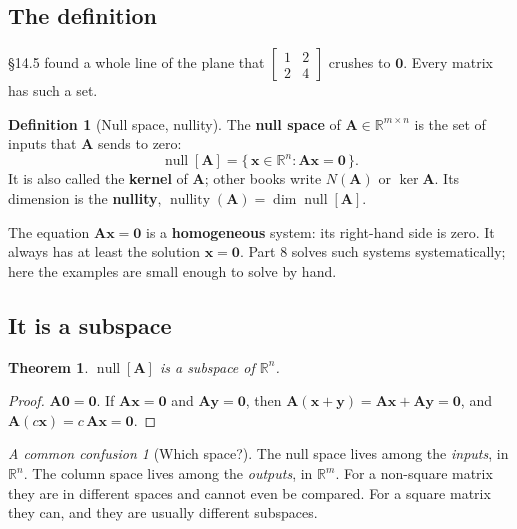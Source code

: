 \documentclass[11pt]{article}
\theoremstyle{plain}
\newtheorem{thm}{Theorem}[section]
\theoremstyle{definition}
\newtheorem{defn}{Definition}[section]
\theoremstyle{remark}
\newtheorem*{warn}{A common confusion}
\newcommand{\R}{\mathbb{R}}
\newcommand{\vc}[1]{\mathbf{#1}}
\newcommand{\mt}[1]{\mathbf{#1}}
\newcommand{\nullsp}[1]{\operatorname{null}[#1]}
\DeclareMathOperator{\nullity}{nullity}
\begin{document}
\subsection{The definition}
\S14.5 found a whole line of the plane that
$\begin{bmatrix}1&2\\2&4\end{bmatrix}$ crushes to $\vc{0}$. Every matrix has
such a set.

\begin{defn}[Null space, nullity]
The \textbf{null space} of $\mt{A}\in\R^{m\times n}$ is the set of inputs that
$\mt{A}$ sends to zero:
\[
  \nullsp{\mt{A}}=\{\,\vc{x}\in\R^{n}:\mt{A}\vc{x}=\vc{0}\,\}.
\]
It is also called the \textbf{kernel} of $\mt{A}$; other books write $N(\mt{A})$
or $\ker\mt{A}$. Its dimension is the \textbf{nullity},
$\nullity(\mt{A})=\dim\nullsp{\mt{A}}$.
\end{defn}

\noindent The equation $\mt{A}\vc{x}=\vc{0}$ is a \textbf{homogeneous} system:
its right-hand side is zero. It always has at least the solution $\vc{x}=\vc{0}$.
Part 8 solves such systems systematically; here the examples are small enough
to solve by hand.

\subsection{It is a subspace}
\begin{thm}
$\nullsp{\mt{A}}$ is a subspace of $\R^{n}$.
\end{thm}

\begin{proof}
$\mt{A}\vc{0}=\vc{0}$. If $\mt{A}\vc{x}=\vc{0}$ and $\mt{A}\vc{y}=\vc{0}$, then
$\mt{A}(\vc{x}+\vc{y})=\mt{A}\vc{x}+\mt{A}\vc{y}=\vc{0}$, and
$\mt{A}(c\vc{x})=c\,\mt{A}\vc{x}=\vc{0}$.
\end{proof}

\begin{warn}[Which space?]
The null space lives among the \emph{inputs}, in $\R^{n}$. The column space
lives among the \emph{outputs}, in $\R^{m}$. For a non-square matrix they are in
different spaces and cannot even be compared. For a square matrix they can, and
they are usually different subspaces.
\end{warn}
\end{document}
